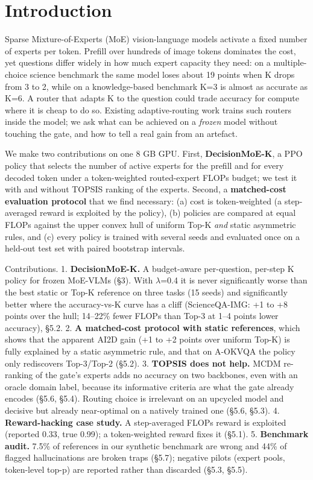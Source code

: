 \section{Introduction}\label{introduction}

Sparse Mixture-of-Experts (MoE) vision-language models activate a fixed number of experts per token. Prefill over hundreds of image tokens dominates the cost, yet questions differ widely in how much expert capacity they need: on a multiple-choice science benchmark the same model loses about 19 points when K drops from 3 to 2, while on a knowledge-based benchmark K=3 is almost as accurate as K=6. A router that adapts K to the question could trade accuracy for compute where it is cheap to do so. Existing adaptive-routing work trains such routers inside the model; we ask what can be achieved on a \emph{frozen} model without touching the gate, and how to tell a real gain from an artefact.

We make two contributions on one 8 GB GPU. First, \textbf{DecisionMoE-K}, a PPO policy that selects the number of active experts for the prefill and for every decoded token under a token-weighted routed-expert FLOPs budget; we test it with and without TOPSIS ranking of the experts. Second, a \textbf{matched-cost evaluation protocol} that we find necessary: (a) cost is token-weighted (a step-averaged reward is exploited by the policy), (b) policies are compared at equal FLOPs against the upper convex hull of uniform Top-K \emph{and} static asymmetric rules, and (c) every policy is trained with several seeds and evaluated once on a held-out test set with paired bootstrap intervals.

Contributions.
1. \textbf{DecisionMoE-K.} A budget-aware per-question, per-step K policy for frozen MoE-VLMs (§3). With $\lambda$=0.4 it is never significantly worse than the best static or Top-K reference on three tasks (15 seeds) and significantly better where the accuracy-vs-K curve has a cliff (ScienceQA-IMG: +1 to +8 points over the hull; 14--22\% fewer FLOPs than Top-3 at 1--4 points lower accuracy), §5.2.
2. \textbf{A matched-cost protocol with static references}, which shows that the apparent AI2D gain (+1 to +2 points over uniform Top-K) is fully explained by a static asymmetric rule, and that on A-OKVQA the policy only rediscovers Top-3/Top-2 (§5.2).
3. \textbf{TOPSIS does not help.} MCDM re-ranking of the gate's experts adds no accuracy on two backbones, even with an oracle domain label, because its informative criteria are what the gate already encodes (§5.6, §5.4). Routing choice is irrelevant on an upcycled model and decisive but already near-optimal on a natively trained one (§5.6, §5.3).
4. \textbf{Reward-hacking case study.} A step-averaged FLOPs reward is exploited (reported 0.33, true 0.99); a token-weighted reward fixes it (§5.1).
5. \textbf{Benchmark audit.} 7.5\% of references in our synthetic benchmark are wrong and 44\% of flagged hallucinations are broken traps (§5.7); negative pilots (expert pools, token-level top-p) are reported rather than discarded (§5.3, §5.5).

